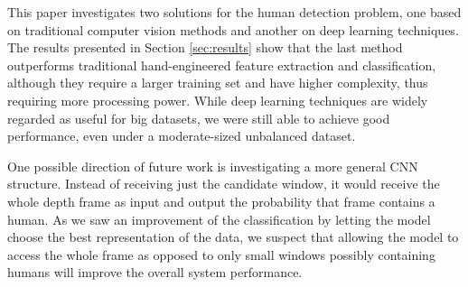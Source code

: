     This paper investigates two solutions for the human detection problem, one based on traditional computer vision methods and another on deep learning techniques. The results presented in Section \ref{sec:results} show that the last method outperforms traditional hand-engineered feature extraction and classification, although they require a larger training set and have higher complexity, thus requiring more processing power. While deep learning techniques are widely regarded as useful for big datasets, we were still able to achieve good performance, even under a moderate-sized unbalanced dataset.

    One possible direction of future work is investigating a more general CNN structure. Instead of receiving just the candidate window, it would receive the whole depth frame as input and output the probability that frame contains a human. As we saw an improvement of the classification by letting the model choose the best representation of the data, we suspect that allowing the model to access the whole frame as opposed to only small windows possibly containing humans will improve the overall system performance.
